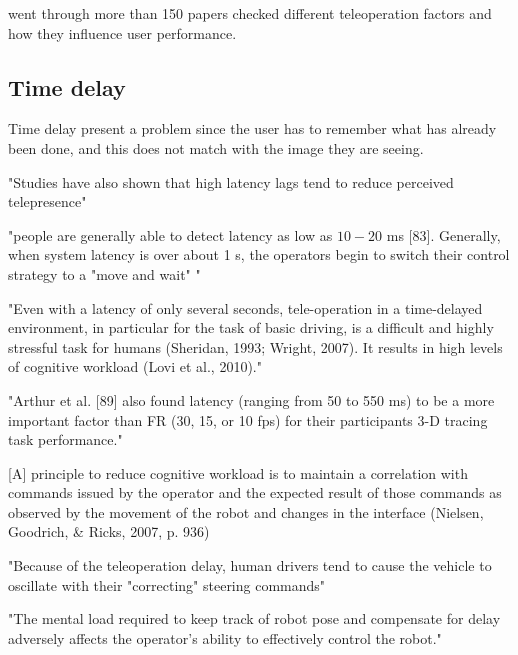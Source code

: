 \citep{Chen2007} went through more than 150 papers checked different teleoperation factors and how they influence user performance.



\subsection{Time delay}


Time delay present a problem since the user has to remember what has already been done, and this does not match with the image they are seeing.

\citep{Chen2007} "Studies have also shown that high latency lags tend to reduce perceived telepresence"

\citep{Chen2007} "people are generally able to detect latency as low as $10-20$ ms [83]. Generally, when system latency is over about 1 s, the operators begin to switch their control strategy to a "move and wait" "

\citep{Matheson2013} "Even with a latency of only several seconds, tele-operation in a time-delayed environment, in particular for the task of basic driving, is a difficult and highly stressful task for humans (Sheridan, 1993; Wright, 2007). It results in high levels of cognitive workload (Lovi et al., 2010)."

"Arthur et al. [89] also found latency (ranging from 50 to 550 ms) to be a more important factor than FR (30, 15, or 10 fps) for their participants 3-D tracing task performance."

[A] principle to reduce cognitive workload is to maintain a correlation with commands issued by the operator and the expected result of those commands as observed by the movement of the robot and changes in the interface (Nielsen, Goodrich, \& Ricks, 2007, p. 936)

\citep{Appelqvist2007} "Because of the teleoperation delay, human drivers
tend to cause the vehicle to oscillate with their "correcting" steering commands" 

\citep{Ricks2004} "The mental load required to keep track of robot pose and compensate for delay adversely affects the operator's ability to effectively control the robot."

